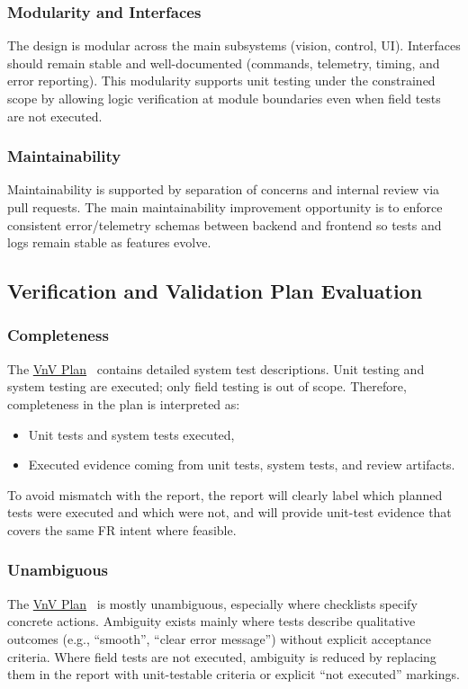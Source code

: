 \documentclass[12pt, titlepage]{article}
\newcommand{\VnVPlan}{\href{../VnVPlan/VnVPlan.pdf}{VnV Plan}}
\begin{document}
\subsubsection{Modularity and Interfaces}
The design is modular across the main subsystems (vision, control, UI).
Interfaces should remain stable and well-documented (commands, telemetry,
timing, and error reporting). This modularity supports unit testing under the
constrained scope by allowing logic verification at module boundaries even when
field tests are not executed.

\subsubsection{Maintainability}
Maintainability is supported by separation of concerns and internal review via
pull requests. The main maintainability improvement opportunity is to enforce
consistent error/telemetry schemas between backend and frontend so tests and
logs remain stable as features evolve.

\subsection{Verification and Validation Plan Evaluation}

\subsubsection{Completeness}
The \VnVPlan~\cite{VnVPlan} contains detailed system test descriptions. Unit
testing and system testing are executed; only field testing is out of scope.
Therefore, completeness in the plan is interpreted as:
\begin{itemize}
  \item Unit tests and system tests executed,
  \item Executed evidence coming from unit tests, system tests, and review artifacts.
\end{itemize}
To avoid mismatch with the report, the report will clearly label which planned
tests were executed and which were not, and will provide unit-test evidence that
covers the same FR intent where feasible.

\subsubsection{Unambiguous}
The \VnVPlan~\cite{VnVPlan} is mostly unambiguous, especially where checklists
specify concrete actions. Ambiguity exists mainly where tests describe
qualitative outcomes (e.g., ``smooth'', ``clear error message'') without
explicit acceptance criteria. Where field tests are not executed, ambiguity is
reduced by replacing them in the report with unit-testable criteria or explicit
``not executed'' markings.
\end{document}
